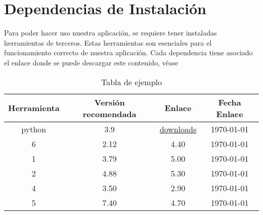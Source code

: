 \chapter{Dependencias de Instalación}
\label{Appendix:Key1}

Para poder hacer uso nuestra aplicación, se requiere tener instaladas herramientas de terceros. Estas herramientas son esenciales para el funcionamiento correcto de nuestra aplicación.
Cada dependencia tiene asociado el enlace donde se puede descargar este contenido, véase


\begin{table}
    \centering
	\begin{tabular}{c|c|c|c}
		\textbf{Herramienta} & \textbf{Versión recomendada} & \textbf{Enlace} & \textbf{Fecha Enlace} \\
		\hline\hline
		python & 3.9 & \href{https://www.python.org/downloads/release/python-390/}{downloads} & \today\\
		6 & 2.12 & 4.40 & \today\\
		1 & 3.79 & 5.00 & \today\\
		2 & 4.88 & 5.30 & \today\\
		4 & 3.50 & 2.90 & \today\\
		5 & 7.40 & 4.70 & \today\\
		\hline
	\end{tabular}
	\caption{Tabla de ejemplo}
	\label{tab:sampleTable}
\end{table}